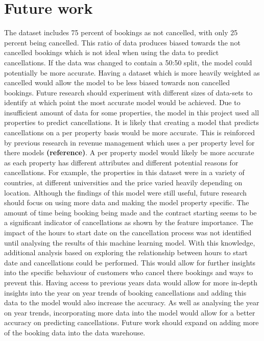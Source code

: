 \section{Future work}
The dataset includes 75 percent of bookings as not cancelled, with only 25 percent being cancelled. This ratio of data produces biased towards the not cancelled bookings which is not ideal when using the data to predict cancellations. If the data was changed to contain a 50:50 split, the model could potentially be more accurate. Having a dataset which is more heavily weighted as cancelled would allow the model to be less biased towards non cancelled bookings. Future research should experiment with different sizes of data-sets to identify at which point the most accurate model would be achieved. 
\vspace{5mm}
Due to insufficient amount of data for some properties, the model in this project used all properties to predict cancellations. It is likely that creating a model that predicts cancellations on a per property basis would be more accurate. This is reinforced by previous research in revenue management which uses a per property level for there models \textbf{(reference)}. A per property model would likely be more accurate as each property has different attributes and different potential reasons for cancellations. For example, the properties in this dataset were in a variety of countries, at different universities and the price varied heavily depending on location. Although the findings of this model were still useful, future research should focus on using more data and making the model property specific. 
\vspace{5mm}
The amount of time being booking being made and the contract starting seems to be a significant indicator of cancellations as shown by the feature importance. The impact of the hours to start date on the cancellation process was not identified until analysing the results of this machine learning model. With this knowledge, additional analysis based on exploring the relationship between hours to start date and cancellations could be performed. This would allow for further insights into the specific behaviour of customers who cancel there bookings and ways to prevent this. 
\vspace{5mm}
Having access to previous years data would allow for more in-depth insights into the year on year trends of booking cancellations and adding this data to the model would also increase the accuracy.  As well as analysing the year on year trends, incorporating more data into the model would allow for a better accuracy on predicting cancellations. Future work should expand on adding more of the booking data into the data warehouse. 
